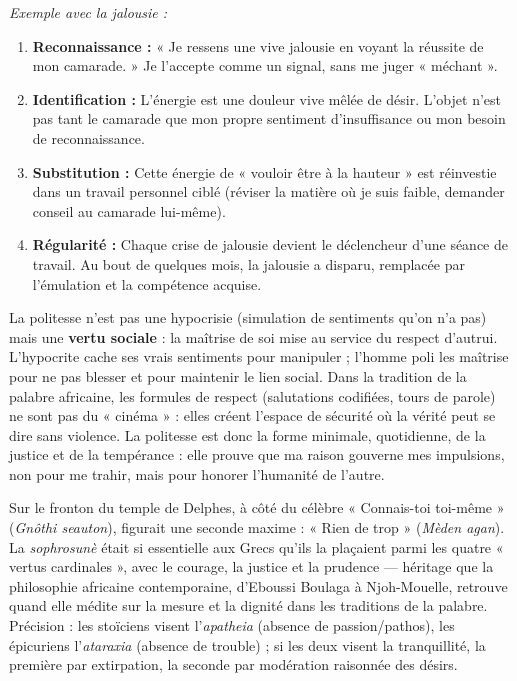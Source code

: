 \documentclass[11pt]{article}
\begin{document}
\begin{corrige}[Exercice 3]
\emph{Exemple avec la jalousie :}
\begin{enumerate}
\item \textbf{Reconnaissance :} « Je ressens une vive jalousie en voyant la réussite de mon camarade. » Je l'accepte comme un signal, sans me juger « méchant ».
\item \textbf{Identification :} L'énergie est une douleur vive mêlée de désir. L'objet n'est pas tant le camarade que mon propre sentiment d'insuffisance ou mon besoin de reconnaissance.
\item \textbf{Substitution :} Cette énergie de « vouloir être à la hauteur » est réinvestie dans un travail personnel ciblé (réviser la matière où je suis faible, demander conseil au camarade lui-même).
\item \textbf{Régularité :} Chaque crise de jalousie devient le déclencheur d'une séance de travail. Au bout de quelques mois, la jalousie a disparu, remplacée par l'émulation et la compétence acquise.
\end{enumerate}
\end{corrige}

\begin{corrige}[Exercice 4]
La politesse n'est pas une hypocrisie (simulation de sentiments qu'on n'a pas) mais une \textbf{vertu sociale} : la maîtrise de soi mise au service du respect d'autrui. L'hypocrite cache ses vrais sentiments pour manipuler ; l'homme poli les maîtrise pour ne pas blesser et pour maintenir le lien social. Dans la tradition de la palabre africaine, les formules de respect (salutations codifiées, tours de parole) ne sont pas du « cinéma » : elles créent l'espace de sécurité où la vérité peut se dire sans violence. La politesse est donc la forme minimale, quotidienne, de la justice et de la tempérance : elle prouve que ma raison gouverne mes impulsions, non pour me trahir, mais pour honorer l'humanité de l'autre.
\end{corrige}

\begin{savaistu}
Sur le fronton du temple de Delphes, à côté du célèbre « Connais-toi toi-même » (\emph{Gnôthi seauton}), figurait une seconde maxime : « Rien de trop » (\emph{Mèden agan}). La \emph{sophrosunè} était si essentielle aux Grecs qu'ils la plaçaient parmi les quatre « vertus cardinales », avec le courage, la justice et la prudence — héritage que la philosophie africaine contemporaine, d'Eboussi Boulaga à Njoh-Mouelle, retrouve quand elle médite sur la mesure et la dignité dans les traditions de la palabre. Précision : les stoïciens visent l'\emph{apatheia} (absence de passion/pathos), les épicuriens l'\emph{ataraxia} (absence de trouble) ; si les deux visent la tranquillité, la première par extirpation, la seconde par modération raisonnée des désirs.
\end{savaistu}
\end{document}
